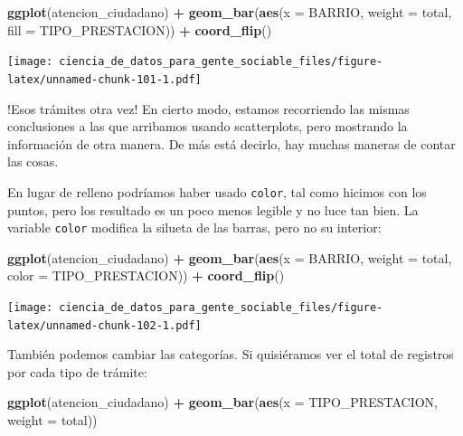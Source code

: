 \documentclass[spanish,]{book}
\newenvironment{Shaded}{\begin{snugshade}}{\end{snugshade}}
\newcommand{\DataTypeTok}[1]{\textcolor[rgb]{0.13,0.29,0.53}{#1}}
\newcommand{\KeywordTok}[1]{\textcolor[rgb]{0.13,0.29,0.53}{\textbf{#1}}}
\newcommand{\NormalTok}[1]{#1}
\newcommand{\OperatorTok}[1]{\textcolor[rgb]{0.81,0.36,0.00}{\textbf{#1}}}
\newcommand{\StringTok}[1]{\textcolor[rgb]{0.31,0.60,0.02}{#1}}
\begin{document}
\begin{Shaded}
\begin{Highlighting}[]
\KeywordTok{ggplot}\NormalTok{(atencion_ciudadano) }\OperatorTok{+}
\StringTok{    }\KeywordTok{geom_bar}\NormalTok{(}\KeywordTok{aes}\NormalTok{(}\DataTypeTok{x =}\NormalTok{ BARRIO, }\DataTypeTok{weight =}\NormalTok{ total, }\DataTypeTok{fill =}\NormalTok{ TIPO_PRESTACION)) }\OperatorTok{+}
\StringTok{    }\KeywordTok{coord_flip}\NormalTok{()}
\end{Highlighting}
\end{Shaded}

\texttt{[image: ciencia\_de\_datos\_para\_gente\_sociable\_files/figure-latex/unnamed-chunk-101-1.pdf]}

!Esos trámites otra vez! En cierto modo, estamos recorriendo las mismas conclusiones a las que arribamos usando scatterplots, pero mostrando la información de otra manera. De más está decirlo, hay muchas maneras de contar las cosas.

En lugar de relleno podríamos haber usado \texttt{color}, tal como hicimos con los puntos, pero los resultado es un poco menos legible y no luce tan bien. La variable \texttt{color} modifica la silueta de las barras, pero no su interior:

\begin{Shaded}
\begin{Highlighting}[]
\KeywordTok{ggplot}\NormalTok{(atencion_ciudadano) }\OperatorTok{+}
\StringTok{    }\KeywordTok{geom_bar}\NormalTok{(}\KeywordTok{aes}\NormalTok{(}\DataTypeTok{x =}\NormalTok{ BARRIO, }\DataTypeTok{weight =}\NormalTok{ total, }\DataTypeTok{color =}\NormalTok{ TIPO_PRESTACION)) }\OperatorTok{+}
\StringTok{    }\KeywordTok{coord_flip}\NormalTok{()}
\end{Highlighting}
\end{Shaded}

\texttt{[image: ciencia\_de\_datos\_para\_gente\_sociable\_files/figure-latex/unnamed-chunk-102-1.pdf]}

También podemos cambiar las categorías. Si quisiéramos ver el total de registros por cada tipo de trámite:

\begin{Shaded}
\begin{Highlighting}[]
\KeywordTok{ggplot}\NormalTok{(atencion_ciudadano) }\OperatorTok{+}
\StringTok{    }\KeywordTok{geom_bar}\NormalTok{(}\KeywordTok{aes}\NormalTok{(}\DataTypeTok{x =}\NormalTok{ TIPO_PRESTACION, }\DataTypeTok{weight =}\NormalTok{ total)) }
\end{Highlighting}
\end{Shaded}
\end{document}
